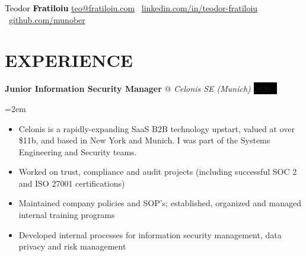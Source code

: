 \documentclass[paper=a4,fontsize=11pt]{scrartcl}
\makeatletter
\newlength{\spacebox}
\newcommand{\sepspace}{\vspace*{0.45em}}		%
\newcommand{\MyName}[1]{ %
                \huge 
                #1 \hfill 
                \par \normalsize \normalfont}
\newcommand{\MySlogan}[1]{ %
		\Large 
		\text{#1} \hfill
		\par \normalsize \normalfont}
\newcommand{\NewPart}[1]{\section*{\uppercase{#1}}}
\newcommand{\PersonalEntry}[2]{
		\noindent\hangindent=2em\hangafter=0 %
		\parbox{\spacebox}{        %
		\textit{#1}}		       %
		\hspace{1.5em} #2 \par}    %
\newcommand{\EducationEntry}[4]{
		\noindent \textit{#1} \hfill      %
		\colorbox{black}{\color{white}#2} \par  %
		\noindent\hangindent=2em\hangafter=0 \small #3 %
		\normalsize \par}
\newcommand{\WorkEntry}[4]{				  %
		\noindent \textbf{#1} @ \textit{#3} \hfill      %
		\colorbox{black}{\color{white}#2} \par  %
		\noindent\hangindent=2em\hangafter=0 \small #4 %
		\normalsize \par}
\makeatother
\begin{document}





\begin{adjustwidth}{-0.9in}{}
     	\textcolor{black}{
	\parbox[b][2.5cm][c]{21cm}{%
            \huge 
            \centering
            \vspace*{1cm}
            \hspace*{3.5cm}Teodor \textbf{Fratiloiu}
            \large
            \newline
            \href{mailto:teo@fratiloiu.com}{teo@fratiloiu.com} \textbar\
            \href{https://www.linkedin.com/in/teodor-fratiloiu/}{linkedin.com/in/teodor-fratiloiu}  \textbar\
            \href{https://github.com/munober}{github.com/munober} 
        }
}

\end{adjustwidth}

\NewPart{Experience}{}

\WorkEntry{Junior Information Security Manager}{2020 – }{Celonis SE (Munich)}
{
\begin{itemize}
  \item Celonis is a rapidly-expanding SaaS B2B technology upstart, valued at over \$11b, and based in New York and Munich. I was part of the Systems Engineering and Security teams.
  \item Worked on trust, compliance and audit projects (including successful SOC 2 and ISO 27001 certifications)
  \item Maintained company policies and SOP's; established, organized and managed internal training programs
  \item Developed internal processes for information security management, data privacy and risk management
\end{itemize}
}
\sepspace
\end{document}
